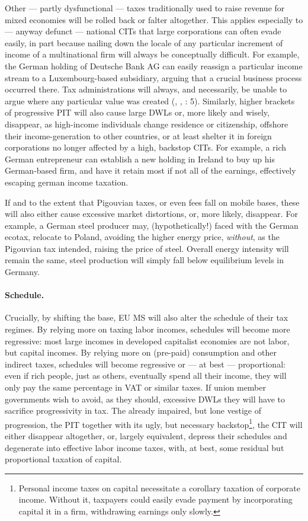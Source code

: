\documentclass[11pt,a4paper,oneside,openright]{article}
\begin{document}
Other --- partly dysfunctional --- taxes traditionally used to raise revenue for mixed economies will be rolled back or falter altogether. This applies especially to --- anyway defunct --- national \glspl{CIT} that large corporations can often evade easily, in part because nailing down the locale of any particular increment of income of a multinational firm will always be conceptually difficult. For example, the German holding of Deutsche Bank AG can easily reassign a particular income stream to a Luxembourg-based subsidiary, arguing that a crucial business process occurred there. Tax administrations will always, and necessarily, be unable to argue where any particular value was created (\citealt{Ganghof2006}, \citealt{Ganghof}, \citealt{Ganghof2007}: 5). Similarly, higher brackets of progressive \gls{PIT} will also cause large \glspl{DWL} or, more likely and wisely, disappear, as high-income individuals change residence or citizenship, offshore their income-generation to other countries, or at least shelter it in foreign corporations no longer affected by a high, backstop \glspl{CIT}. For example, a rich German entrepreneur can establish a new holding in Ireland to buy up his German-based firm, and have it retain most if not all of the earnings, effectively escaping german income taxation. 

If and to the extent that Pigouvian taxes, or even fees fall on mobile bases, these will also either cause excessive market distortions, or, more likely, disappear. For example, a German steel producer may, (hypothetically!) faced with the German ecotax, relocate to Poland, avoiding the higher energy price, \emph{without}, as the Pigouvian tax intended, raising the price of steel. Overall energy intensity will remain the same, steel production will simply fall below equilibrium levels in Germany.

\paragraph{Schedule.} Crucially, by shifting the base, \gls{EU} \gls{MS} will also alter the schedule of their tax regimes. By relying more on taxing labor incomes, schedules will become more regressive: most large incomes in developed capitalist economies are not labor, but capital incomes. By relying more on (pre-paid) consumption and other indirect taxes, schedules will become regressive or --- at best --- proportional: even if rich people, just as others, eventually spend all their income, they will only pay the same percentage in \gls{VAT} or similar taxes. If union member governments wish to avoid, as they should, excessive \glspl{DWL} they will have to sacrifice progressivity in tax. The already impaired, but lone vestige of progression, the \gls{PIT} together with its ugly, but necessary backstop\footnote{
	Personal income taxes on capital necessitate a corollary taxation of corporate income. Without it, taxpayers could easily evade payment by incorporating capital it in a firm, withdrawing earnings only slowly.}, 
the \gls{CIT} will either disappear altogether, or, largely equivalent, depress their schedules and degenerate into effective labor income taxes, with, at best, some residual but proportional taxation of capital.
\end{document}
